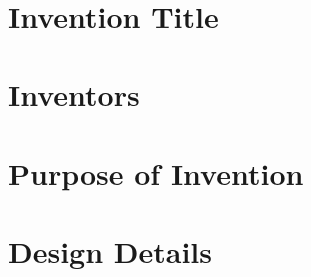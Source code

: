 \documentclass[letterpaper, 10 pt, onecolumn]{ieeeconf}
\begin{document}
\newtheorem{lem}{\bf Lemma}%
\newtheorem{rem}{\bf Remark}%
\newtheorem{pro}{\bf Proposition}%
\newtheorem{defn}{\bf Definition}%
\newtheorem{thm}{\bf Theorem}%
\newtheorem{assu}{Assumption}%
\newcommand{\tr}{{\rm tr}}
\newcommand{\ts}{& \hspace{-0.05in}}
\newcommand{\nn}{\nonumber}
\newtheorem{ex}{Example}[section]
\newcommand{\bp}{\bigskip}
\newcommand{\slp}{\smallskip}
\newcommand{\diag}{{\rm diag}}
\newcommand{\sign}{{\rm sign}}
\baselineskip 0.41cm
\newcommand{\rank}{{\rm rank}}
\newcommand{\qed}{\hfill \ensuremath{\Box}}




\title{\bf \LARGE }

\author{}
\date{}
\maketitle





\section{\bf Invention Title}

\section{\bf Inventors}

\section{\bf Purpose of Invention}

\section{\bf Design Details}



\end{document}
